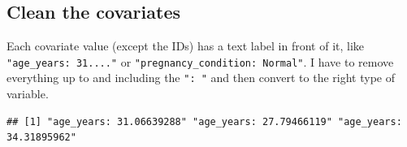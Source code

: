 \documentclass[
]{article}
\newenvironment{Shaded}{\begin{snugshade}}{\end{snugshade}}
\newcommand{\CommentTok}[1]{\textcolor[rgb]{0.56,0.35,0.01}{\textit{#1}}}
\newcommand{\DecValTok}[1]{\textcolor[rgb]{0.00,0.00,0.81}{#1}}
\newcommand{\FunctionTok}[1]{\textcolor[rgb]{0.13,0.29,0.53}{\textbf{#1}}}
\newcommand{\NormalTok}[1]{#1}
\newcommand{\SpecialCharTok}[1]{\textcolor[rgb]{0.81,0.36,0.00}{\textbf{#1}}}
\begin{document}
\subsection{Clean the covariates}\label{clean-the-covariates}

Each covariate value (except the IDs) has a text label in front of it,
like \texttt{"age\_years:\ 31...."} or
\texttt{"pregnancy\_condition:\ Normal"}. I have to remove everything up
to and including the \texttt{":\ "} and then convert to the right type
of variable.

\begin{Shaded}
\end{Shaded}

\begin{verbatim}
## [1] "age_years: 31.06639288" "age_years: 27.79466119" "age_years: 34.31895962"
\end{verbatim}
\end{document}
